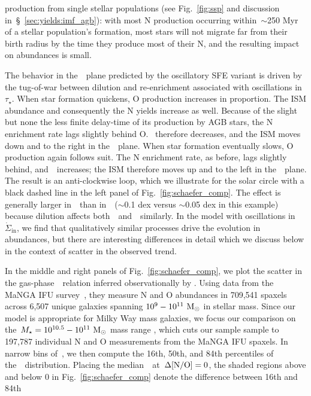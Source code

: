 \documentclass[ms.tex]{subfiles}
\begin{document}
production from single stellar populations (see Fig.~\ref{fig:ssp} and
discussion in~\S~\ref{sec:yields:imf_agb}): with most N production occurring
within~$\sim$250 Myr of a stellar population's formation, most stars will not
migrate far from their birth radius by the time they produce most of their N,
and the resulting impact on abundances is small.
\par
The behavior in the~\ohno~plane predicted by the oscillatory SFE variant
is driven by the tug-of-war between dilution and re-enrichment
associated with oscillations in~$\tau_\star$.
When star formation quickens, O production increases in proportion.
The ISM abundance and consequently the N yields increase as well.
Because of the slight but none the less finite delay-time of its production by
AGB stars, the N enrichment rate lags slightly behind O.
\no~therefore decreases, and the ISM moves down and to the right in
the~\ohno~plane.
When star formation eventually slows, O production again follows suit.
The N enrichment rate, as before, lags slightly behind, and~\no~increases; the
ISM therefore moves up and to the left in the~\ohno~plane.
The result is an anti-clockwise loop, which we illustrate for the solar circle
with a black dashed line in the left panel of Fig.~\ref{fig:schaefer_comp}.
The effect is generally larger in~\oh~than in~\no~($\sim$0.1 dex versus
$\sim$0.05 dex in this example) because dilution affects
both~\oh~and~\nh~similarly.
In the model with oscillations in~$\dot{\Sigma}_\text{in}$, we find that
qualitatively similar processes drive the evolution in abundances, but there
are interesting differences in detail which we discuss below in the context of
scatter in the observed trend.
\par
In the middle and right panels of Fig.~\ref{fig:schaefer_comp}, we plot the
scatter in the gas-phase~\ohno~relation inferred observationally by
\citet{Schaefer2020}.
Using data from the MaNGA IFU survey~\citep{Bundy2015}, they measure N and O
abundances in 709,541 spaxels across 6,507 unique galaxies spanning
$10^9 - 10^{11}~\text{M}_\odot$ in stellar mass.
Since our model is appropriate for Milky Way mass galaxies, we focus our
comparison on the~$M_\star = 10^{10.5} - 10^{11}~\text{M}_\odot$ mass range
\citep{Licquia2015}, which cuts our sample sample to 197,787 individual N and O
measurements from the MaNGA IFU spaxels.
In narrow bins of~\oh, we then compute the 16th, 50th, and 84th percentiles of
the~\no~distribution.
Placing the median~\no~at~$\Delta\text{[N/O]} = 0$, the shaded regions above and below
0 in Fig.~\ref{fig:schaefer_comp} denote the difference between 16th and 84th
\end{document}
